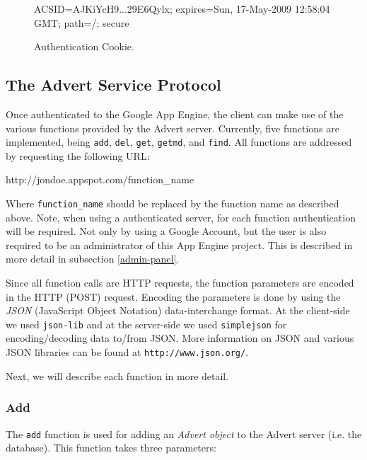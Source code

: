 \begin{figure*}[ht] %
\begin{center}
\begin{code}
ACSID=AJKiYcH9...29E6Qylx; expires=Sun, 17-May-2009 12:58:04 GMT;
    path=/; secure
\end{code}
\caption{Authentication Cookie.\label{auth-cookie}}
\end{center}
\end{figure*}

\subsection{The Advert Service Protocol}
\label{protocol}
Once authenticated to the Google App Engine, the client can make use of the
various functions provided by the Advert server. Currently, five functions are
implemented, being \texttt{add}, \texttt{del}, \texttt{get}, \texttt{getmd},
and \texttt{find}. All functions are addressed by requesting the following URL:

\begin{center}
\begin{code}
http://jondoe.appspot.com/function_name
\end{code}
\end{center}

Where \texttt{function\_name} should be replaced by the function name as
described above. Note, when using a authenticated server, for each function
authentication will be required. Not only by using a Google Account, but
the user is also required to be an administrator of this App Engine project.
This
is described in more detail in subsection \ref{admin-panel}.

Since all function calls are HTTP requests, the function parameters are encoded
in the HTTP (POST) request. Encoding the parameters is done by using the
\emph{JSON} (JavaScript Object Notation) data-interchange format. At the
client-side we used \texttt{json-lib} and at the server-side we used
\texttt{simplejson} for encoding/decoding data to/from JSON. More information
on JSON and various JSON libraries can be found at \texttt{http://www.json.org/}.

Next, we will describe each function in more detail.

\subsubsection{Add}
\label{add}
The \texttt{add} function is used for adding an \emph{Advert object} to the
Advert server (i.e. the database). This function takes three parameters:

